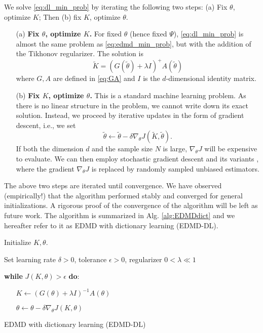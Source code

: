 \documentclass[%
 aip,
 cha,
 sd,%
 amsmath,amssymb,
 preprint,%
]{revtex4-1}
\begin{document}
We solve \eqref{eq:dl_min_prob} by iterating the following two steps: (a) Fix $\theta$, optimize $K$; Then (b) fix $K$, optimize $\theta$.

\begin{enumerate}
	\item[(a)] \textbf{Fix $\theta$, optimize $K$.}
	For fixed $\theta$ (hence fixed $\Psi$), \eqref{eq:dl_min_prob} is almost the same problem as \eqref{eq:edmd_min_prob}, but with the addition of the Tikhonov regularizer. The solution is \cite{golub2012matrix}
	\begin{equation}
	\tilde{K} = (G(\tilde{\theta})+\lambda I)^{+} A(\tilde{\theta})
	\end{equation}
	where $G,A$ are defined in \eqref{eq:GA} and $I$ is the $d$-dimensional identity matrix. 
	\item[(b)] \textbf{Fix $K$, optimize $\theta$.} 
	This is a standard machine learning problem. As there is no linear
	structure in the problem, we cannot write down its exact solution.
	Instead, we proceed by iterative updates in the form of gradient descent, i.e., we set 
	\begin{equation}
	\tilde{\theta} \leftarrow \tilde{\theta} - \delta \nabla_{\theta} J(\tilde{K}, \tilde{\theta}).
	\end{equation}
	If both the dimension $d$ and the sample size $N$ is large, $\nabla_\theta J$ will be expensive to evaluate.
	We can then employ stochastic gradient descent and its variants \cite{ruder2016overview}, where the gradient
	$\nabla_\theta J$ is replaced by randomly sampled unbiased estimators. 
\end{enumerate}
The above two steps are iterated until convergence. We have observed (empirically!) that the algorithm performed stably and converged for general initializations. A rigorous proof of the convergence of the algorithm will be left as future work. 
The algorithm is summarized in Alg. \ref{alg:EDMDdict} and we hereafter refer to it as EDMD with dictionary learning (EDMD-DL). 
\begin{algorithm}[H]
	Initialize $K,\theta$. 
	
	Set learning rate $\delta>0$, tolerance $\epsilon>0$, regularizer $0<\lambda\ll 1$
	
	\textbf{while} $J(K,\theta)>\epsilon$ \textbf{do}:
	\begin{itemize}
		\item[] $K \leftarrow  (G(\theta)+\lambda I)^{-1} A(\theta) $ 
		\item[] $\theta \leftarrow \theta - \delta \nabla_\theta J(K, \theta)$
	\end{itemize}
	\caption{EDMD with dictionary learning (EDMD-DL) \label{alg:EDMDdict}}
\end{algorithm}
\end{document}
